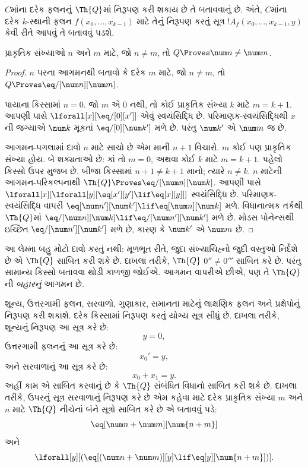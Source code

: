 \documentclass[../../../include/open-logic-section]{subfiles}
\begin{document}

$C$માંના દરેક ફલનનું
$\Th{Q}$માં નિરૂપણ
કરી શકાય છે તે
બતાવવાનું છે. અંતે,
$C$માંના દરેક $k$-સ્થાની
ફલન $f(x_0,\dots,x_{k-1})$
માટે તેનું નિરૂપણ
કરતું સૂત્ર
$!A_f(x_0,\dots,x_{k-1},y)$
કેવી રીતે આપવું
તે બતાવવું પડશે.

\begin{lem}
પ્રાકૃતિક સંખ્યાઓ $n$
અને $m$ માટે, જો
$n \neq m$, તો
$Q \Proves \num
n \neq \num m$.
\end{lem}

\begin{proof}
$n$ પરના આગમનથી
બતાવો કે દરેક $m$
માટે, જો $n \neq m$,
તો $Q \Proves \eq/[\num n][\num m]$.

પાયાના કિસ્સામાં
$n = 0$. જો $m$
એ $0$ નથી, તો
કોઈ પ્રાકૃતિક
સંખ્યા $k$ માટે
$m = k + 1$.
આપણી પાસે
$\lforall[x][\eq/[0][x']]$
એવું સ્વયંસિદ્ધિ છે.
પરિમાણક-સ્વયંસિદ્ધિથી
$x$ની જગ્યાએ
$\num k$ મૂકતાં
$\eq/[0][\num k']$
મળે છે. પરંતુ
$\num k'$ એ
$\num m$ જ છે.

આગમન-પગલામાં
દાવો $n$ માટે સાચો
છે એમ માની $n+1$
વિચારો. $m$ કોઈ
પણ પ્રાકૃતિક
સંખ્યા હોય. બે
શક્યતાઓ છે:
કાં તો $m = 0$,
અથવા કોઈ $k$
માટે $m = k+1$.
પહેલો કિસ્સો
ઉપર મુજબ છે.
બીજા કિસ્સામાં
$n+1 \neq k+1$
માનો; ત્યારે
$n \neq k$.
$n$ માટેની
આગમન-પરિકલ્પનાથી
$\Th{Q} \Proves \eq/[\num n][\num k]$.
આપણી પાસે
$\lforall[x][\lforall[y][\eq[x'][y'] \lif \eq[x][y]]]$
સ્વયંસિદ્ધિ છે.
પરિમાણક-સ્વયંસિદ્ધિ
વાપરી
$\eq[\num n'][\num k'] \lif \eq[\num n][\num
  k]$ મળે. વિધાનાત્મક
તર્કથી $\Th{Q}$માં
$\eq/[\num n][\num k] \lif \eq/[\num n'][\num k']$
મળે છે. મોડસ
પોનેન્સથી ઇચ્છિત
$\eq/[\num n'][\num k']$
મળે છે, કારણ કે
$\num k'$ એ
$\num m$ છે.
\end{proof}

આ લેમ્મા બહુ મોટો
દાવો કરતું નથી:
મૂળભૂત રીતે, જુદા
સંખ્યાચિહ્નો જુદી
વસ્તુઓ નિર્દેશે છે
એ $\Th{Q}$ સાબિત
કરી શકે છે. દાખલા
તરીકે, $\Th{Q}$
$0'' \neq 0'''$
સાબિત કરે છે.
પરંતુ સામાન્ય કિસ્સો
બતાવવા થોડી
કાળજી જોઈએ.
આગમન વાપરીએ
છીએ, પણ તે
$\Th{Q}$ની
\emph{બહારનું}
આગમન છે.

શૂન્ય, ઉત્તરગામી ફલન, સરવાળો, ગુણાકાર, સમાનતા માટેનું
લાક્ષણિક ફલન અને પ્રક્ષેપોનું નિરૂપણ કરી શકાશે.
દરેક કિસ્સામાં નિરૂપણ કરતું યોગ્ય સૂત્ર સીધું છે.
દાખલા તરીકે, શૂન્યનું નિરૂપણ આ સૂત્ર કરે છે:
\[
y = 0,
\]
ઉત્તરગામી ફલનનું આ સૂત્ર કરે છે:
\[
x_0' = y,
\]
અને સરવાળાનું આ સૂત્ર કરે છે:
\[
x_0 + x_1 = y.
\]
અહીં કામ એ સાબિત કરવાનું છે કે $\Th{Q}$ સંબંધિત વિધાનો
સાબિત કરી શકે છે. દાખલા તરીકે, ઉપરનું સૂત્ર સરવાળાનું
નિરૂપણ કરે છે એમ કહેવા માટે દરેક પ્રાકૃતિક સંખ્યા
$m$ અને $n$ માટે $\Th{Q}$ નીચેનાં બંને સૂત્રો સાબિત કરે છે
એ બતાવવું પડે:
\[
\eq[\num n + \num m][\num {n+m}]
\]
અને
\[
\lforall[y][(\eq[(\num n + \num m)][y] \lif \eq[y][\num {n+m}])].
\]
\end{document}
